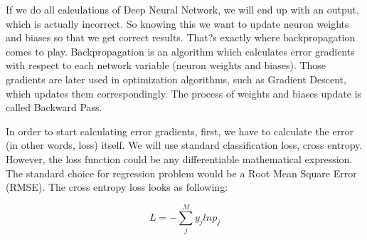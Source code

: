 If we do all calculations of Deep Neural Network, we will end up with an output, which is actually incorrect. So knowing this we want to update neuron weights and biases so that we get correct results. That?s exactly where backpropagation comes to play. Backpropagation is an algorithm which calculates error gradients with respect to each network variable (neuron weights and biases). Those gradients are later used in optimization algorithms, such as Gradient Descent, which updates them correspondingly. The process of weights and biases update is called Backward Pass.

In order to start calculating error gradients, first, we have to calculate the error (in other words, loss) itself. We will use standard classification loss, cross entropy. However, the loss function could be any differentiable mathematical expression. The standard choice for regression problem would be a Root Mean Square Error (RMSE). The cross entropy loss looks as following:

\begin{equation} \label{eq:reward-func}
L = - \sum_j^M y_j ln p_j
\end{equation}

\vfill
